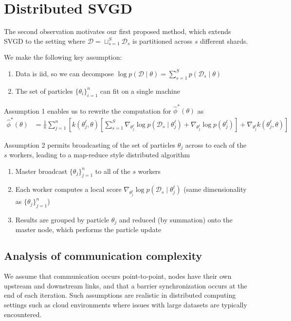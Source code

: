 \documentclass{article}
\newcommand{\cD}{\mathcal{D}}
\begin{document}
\section{Distributed SVGD}
\label{sec:distributed_svgd}

The second observation motivates our first proposed method, which extends SVGD
to the setting where $\cD = \sqcup_{s=1}^S \cD_s$ is partitioned across $s$ different shards.

We make the following key assumption:
\begin{enumerate}
    \item Data is iid, so we can decompose $\log p(\cD \mid \theta) = \sum_{s=1}^S p(\cD_s \mid \theta)$
    \item The set of particles $\{\theta_i\}_{i=1}^n$ can fit on a single machine
\end{enumerate}

Assumption 1 enables us to rewrite the computation for $\hat\phi^*(\theta)$ as
\begin{align}
    \hat\phi^*(\theta)
    &= \frac{1}{n} \sum_{j=1}^n \left[
        k(\theta_j^\ell, \theta) \left[
            \sum_{s=1}^S \nabla_{\theta_j^\ell} \log p(\cD_s \mid \theta_j^\ell) + \nabla_{\theta_j^\ell} \log p(\theta_j^\ell)
        \right]
        + \nabla_{\theta_j^\ell} k(\theta_j^\ell, \theta)
    \right]
\end{align}

Assumption 2 permits broadcasting of the set of particles $\theta_j$ across to each of the $s$ workers, leading
to a map-reduce style distributed algorithm
\begin{enumerate}
    \item Master broadcast $\{\theta_j\}_{j=1}^n$ to all of the $s$ workers
    \item Each worker computes a local score $\nabla_{\theta_j^\ell} \log p(\cD_s \mid \theta_j^\ell)$ (same dimensionality as $\{\theta_j\}_{j=1}^n$)
    \item Results are grouped by particle $\theta_j$ and reduced (by summation) onto the master node, which performs the particle update
\end{enumerate}

\subsection{Analysis of communication complexity}
\label{sub:analysis_of_communication_complexity}

We assume that communication occurs point-to-point, nodes have their own
upstream and downstream links, and that a barrier synchronization occurs at the
end of each iteration. Such assumptions are realistic in distributed computing
settings such as cloud environments where issues with large datasets are typically
encountered.
\end{document}
